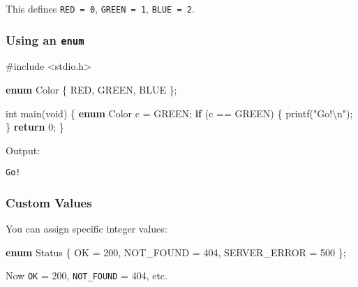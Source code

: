 \documentclass[
  letterpaper,
  DIV=11,
  numbers=noendperiod]{scrreprt}
\newenvironment{Shaded}{\begin{snugshade}}{\end{snugshade}}
\newcommand{\ControlFlowTok}[1]{\textcolor[rgb]{0.00,0.23,0.31}{\textbf{#1}}}
\newcommand{\DataTypeTok}[1]{\textcolor[rgb]{0.68,0.00,0.00}{#1}}
\newcommand{\DecValTok}[1]{\textcolor[rgb]{0.68,0.00,0.00}{#1}}
\newcommand{\ImportTok}[1]{\textcolor[rgb]{0.00,0.46,0.62}{#1}}
\newcommand{\KeywordTok}[1]{\textcolor[rgb]{0.00,0.23,0.31}{\textbf{#1}}}
\newcommand{\NormalTok}[1]{\textcolor[rgb]{0.00,0.23,0.31}{#1}}
\newcommand{\OperatorTok}[1]{\textcolor[rgb]{0.37,0.37,0.37}{#1}}
\newcommand{\PreprocessorTok}[1]{\textcolor[rgb]{0.68,0.00,0.00}{#1}}
\newcommand{\SpecialCharTok}[1]{\textcolor[rgb]{0.37,0.37,0.37}{#1}}
\newcommand{\StringTok}[1]{\textcolor[rgb]{0.13,0.47,0.30}{#1}}
\begin{document}
This defines \texttt{RED\ =\ 0}, \texttt{GREEN\ =\ 1},
\texttt{BLUE\ =\ 2}.

\subsubsection{\texorpdfstring{Using an
\texttt{enum}}{Using an enum}}\label{using-an-enum}

\begin{Shaded}
\begin{Highlighting}[]
\PreprocessorTok{\#include }\ImportTok{\textless{}stdio.h\textgreater{}}

\KeywordTok{enum}\NormalTok{ Color }\OperatorTok{\{}\NormalTok{ RED}\OperatorTok{,}\NormalTok{ GREEN}\OperatorTok{,}\NormalTok{ BLUE }\OperatorTok{\};}

\DataTypeTok{int}\NormalTok{ main}\OperatorTok{(}\DataTypeTok{void}\OperatorTok{)} \OperatorTok{\{}
    \KeywordTok{enum}\NormalTok{ Color c }\OperatorTok{=}\NormalTok{ GREEN}\OperatorTok{;}
    \ControlFlowTok{if} \OperatorTok{(}\NormalTok{c }\OperatorTok{==}\NormalTok{ GREEN}\OperatorTok{)} \OperatorTok{\{}
\NormalTok{        printf}\OperatorTok{(}\StringTok{"Go!}\SpecialCharTok{\textbackslash{}n}\StringTok{"}\OperatorTok{);}
    \OperatorTok{\}}
    \ControlFlowTok{return} \DecValTok{0}\OperatorTok{;}
\OperatorTok{\}}
\end{Highlighting}
\end{Shaded}

Output:

\begin{verbatim}
Go!
\end{verbatim}

\subsubsection{Custom Values}\label{custom-values}

You can assign specific integer values:

\begin{Shaded}
\begin{Highlighting}[]
\KeywordTok{enum}\NormalTok{ Status }\OperatorTok{\{}
\NormalTok{    OK }\OperatorTok{=} \DecValTok{200}\OperatorTok{,}
\NormalTok{    NOT\_FOUND }\OperatorTok{=} \DecValTok{404}\OperatorTok{,}
\NormalTok{    SERVER\_ERROR }\OperatorTok{=} \DecValTok{500}
\OperatorTok{\};}
\end{Highlighting}
\end{Shaded}

Now \texttt{OK} = 200, \texttt{NOT\_FOUND} = 404, etc.
\end{document}
